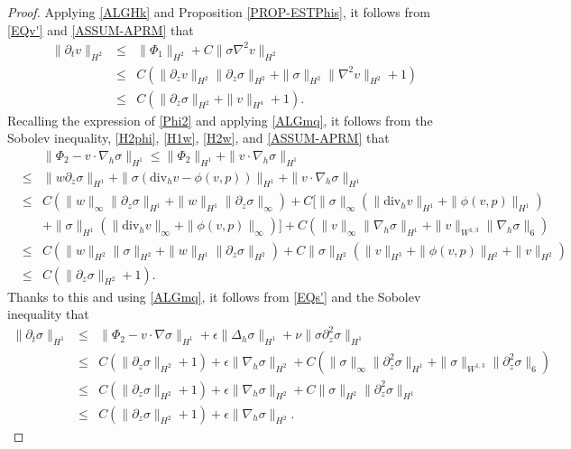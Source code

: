 \documentclass[12pt,reqno]{amsart}
\numberwithin{equation}{section}
\begin{document}
\begin{proof}
  Applying \eqref{ALGHk} and Proposition \ref{PROP-ESTPhis}, it follows from \eqref{EQv'} and \eqref{ASSUM-APRM} that
  \begin{eqnarray}
    \|\partial_tv\|_{H^2}&\leq&\|\Phi_1\|_{H^2}+C\|\sigma\nabla^2v\|_{H^2}\nonumber\\
    &\leq&C(\|\partial_zv\|_{H^2}\|\partial_z\sigma\|_{H^2}+\|\sigma\|_{H^2}\|\nabla^2 v\|_{H^2}+1)\nonumber\\
    &\leq&C(\|\partial_z\sigma\|_{H^2}+\|v\|_{H^4}+1).\label{910-1}
  \end{eqnarray}
  Recalling the expression of \eqref{Phi2} and applying \eqref{ALGmq}, it follows from the Sobolev inequality, \eqref{H2phi}, \eqref{H1w}, \eqref{H2w}, and \eqref{ASSUM-APRM} that
  \begin{eqnarray*}
    &&\|\Phi_2-v\cdot\nabla_h\sigma\|_{H^1}\leq\|\Phi_2\|_{H^1}+\|v\cdot\nabla_h\sigma\|_{H^1}\\
    &\leq&\|w\partial_z\sigma\|_{H^1}+\|\sigma(\text{div}_hv-\phi(v,p))\|_{H^1}+\|v\cdot\nabla_h\sigma\|_{H^1}\\
    &\leq&C(\|w\|_\infty\|\partial_z\sigma\|_{H^1}+\|w\|_{H^1}\|\partial_z\sigma\|_\infty)+C[\|\sigma\|_\infty(\|\text{div}_hv\|_{H^1}+\|\phi(v,p)\|_{H^1})\\
    &&+\|\sigma\|_{H^1}(\|\text{div}_hv\|_\infty+\|\phi(v,p)\|_\infty)]+C(\|v\|_\infty\|\nabla_h\sigma\|_{H^1}+\|v\|_{W^{1,3}}\|\nabla_h\sigma\|_6)\\
    &\leq&C(\|w\|_{H^2}\|\sigma\|_{H^2}+\|w\|_{H^1}\|\partial_z\sigma\|_{H^2})+C\|\sigma\|_{H^2}(\|v\|_{H^3}+\|\phi(v,p)\|_{H^2}+\|v\|_{H^2})\\
    &\leq&C(\|\partial_z\sigma\|_{H^2}+1).
  \end{eqnarray*}
  Thanks to this and using \eqref{ALGmq}, it follows from \eqref{EQs'} and the Sobolev inequality that
  \begin{eqnarray}
    \|\partial_t\sigma\|_{H^1}&\leq&\|\Phi_2-v\cdot\nabla\sigma\|_{H^1}+\epsilon\|\Delta_h\sigma\|_{H^1}+\nu\|\sigma\partial_z^2\sigma\|_{H^1}\nonumber\\
    &\leq&C(\|\partial_z\sigma\|_{H^2}+1)+\epsilon\|\nabla_h\sigma\|_{H^2}+C(\|\sigma\|_\infty\|\partial_z^2\sigma\|_{H^1}+\|\sigma\|_{W^{1,3}}\|\partial_z^2\sigma\|_6)\nonumber\\
    &\leq&C(\|\partial_z\sigma\|_{H^2}+1)+\epsilon\|\nabla_h\sigma\|_{H^2}+C\|\sigma\|_{H^2}\|\partial_z^2\sigma\|_{H^1}\nonumber\\
    &\leq&C(\|\partial_z\sigma\|_{H^2}+1)+\epsilon\|\nabla_h\sigma\|_{H^2}.\label{910-2}

\end{eqnarray}
\end{proof}
\end{document}

